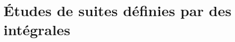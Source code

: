 \documentclass[a4paper, 11pt,reqno]{article}
\begin{document}




\noindent \section{{\bf\Large{ \'Etudes de suites d\'efinies par des int\'egrales }}}

\end{document}
